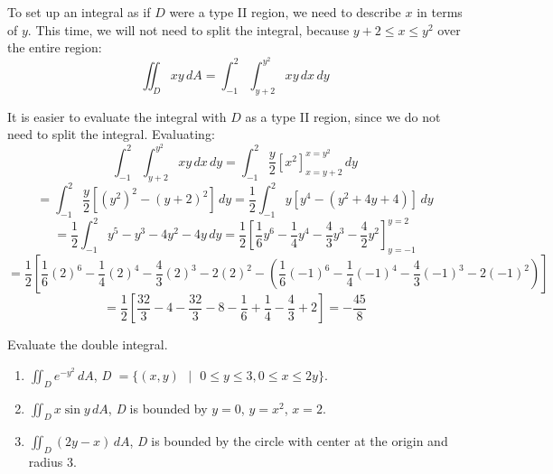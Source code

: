 To set up an integral as if $D$ were a type II region, we need to describe $x$ 
in terms of $y$. This time, we will not need to split the integral, because $y + 2 
\leq x \leq y^2$ over the entire region:
$$\iint_{D} xy\,dA = \int_{-1}^2 \int_{y + 2}^{y^2} xy\,dx\,dy$$

It is easier to evaluate the integral with $D$ as a type II region, since we 
do not need to split the integral. Evaluating:
$$\int_{-1}^2 \int_{y + 2}^{y^2} xy\,dx\,dy = \int_{-1}^2 \frac{y}{2} \left[ 
x^2 \right]_{x = y + 2}^{x = y^2}\,dy$$
$$= \int_{-1}^2 \frac{y}{2} \left[ \left( y^2 \right)^2 - \left( y + 2 
\right)^2 \right]\,dy = \frac{1}{2} \int_{-1}^2 y \left[ y^4 - \left( y^2 + 4y 
+ 4 \right) \right]\,dy$$
$$= \frac{1}{2} \int_{-1}^2 y^5 - y^3 - 4y^2 - 4y\,dy = \frac{1}{2} \left[ 
\frac{1}{6}y^6 - \frac{1}{4}y^4 - \frac{4}{3}y^3 - \frac{4}{2}y^2 \right]_{
y = -1}^{y = 2}$$
$$= \frac{1}{2} \left[ \frac{1}{6} \left( 2 \right)^6 - \frac{1}{4} \left( 2 
\right)^4 - \frac{4}{3} \left( 2 \right)^3 - 2 \left( 2 \right)^2 - \left( 
\frac{1}{6} \left( -1 \right)^6 - \frac{1}{4} \left( -1 \right)^4 - \frac{4}{3} 
\left( -1 \right)^3 - 2 \left( -1 \right)^2 \right) \right]$$
$$= \frac{1}{2} \left[ \frac{32}{3} - 4 - \frac{32}{3} - 8 - \frac{1}{6} + 
\frac{1}{4} - \frac{4}{3} + 2 \right] = -\frac{45}{8}$$

\begin{Exercise}[title = {Double Integrals over Non-Rectangular Regions}, 
label = non-rect]
Evaluate the double integral.
\begin{enumerate}
\item $\iint_{\textit{D}} e^{-y^2} \,dA$, \textit{D} $= \{(x, y) \text{ } | 
\text{ } 0 \leq y \leq 3, 0 \leq x \leq 2y \}$.
\item $\iint_{\textit{D}} x \sin{y}\,dA$, \textit{D} is bounded by $y = 0$, 
$y = x^2$, $x = 2$. 
\item $\iint_{\textit{D}} \left(2y - x \right)\,dA$, \textit{D} is bounded by 
the circle with center at the origin and radius 3. 
\vspace{75mm}
\end{enumerate}
\end{Exercise}

